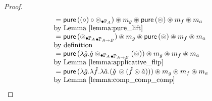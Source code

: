 \documentclass{article}
\begin{document}
\begin{proof}
$$\begin{array}{ll}
{}=   \mathsf{pure}\, ((\circ) \circ \mathbin{\circledcirc_{\bullet \mathbb{P}_{A}}}) \circledast m_g \circledast \mathsf{pure}\, (\circledcirc) \circledast m_f \circledast m_a\\
 \mbox{by Lemma \ref{lemma:pure_lift}}\\
{}=    \mathsf{pure}\, (\mathbin{\mathbin{\circledcirc_{\bullet \mathbb{P}_{A}}}_{\bullet \mathbb{P}_{A\rightarrow B}}}) \circledast m_g \circledast \mathsf{pure}\, (\circledcirc) \circledast m_f  \circledast m_a\\
 \mbox{by definition}\\
{}= \mathsf{pure}\, (\lambda \check{g} . \check{g} \mathbin{\mathbin{\circledcirc_{\bullet \mathbb{P}_{A}}}_{\bullet \mathbb{P}_{A\rightarrow B}}} (\circledcirc) ) \circledast m_g  \circledast m_f  \circledast m_a\\
 \mbox{by Lemma \ref{lemma:applicative_flip}}\\
{}=  \mathsf{pure}\, (\lambda \check{g} . \lambda \check{f}. \lambda \check{a} . (\check{g}\, \circledcirc (\check{f} \circledcirc \check{a})) ) \circledast m_g  \circledast m_f  \circledast m_a\\
 \mbox{by Lemma \ref{lemma:comp_comp_comp}}\\
\end{array}
$$
\end{proof}

\newpage
\end{document}
